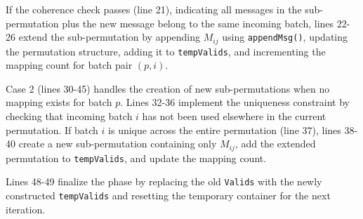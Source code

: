 \documentclass{article}
\begin{document}
If the coherence check passes (line 21), 
indicating all messages in the sub-permutation 
plus the new message belong to the same 
incoming batch, lines 22-26 extend the 
sub-permutation by appending $M_{ij}$ 
using \texttt{appendMsg()}, updating the 
permutation structure, adding it 
to \texttt{tempValids}, and incrementing 
the mapping count for batch pair $(p,i)$.

Case 2 (lines 30-45) handles the creation 
of new sub-permutations when no mapping 
exists for batch $p$. Lines 32-36 implement 
the uniqueness constraint by checking that 
incoming batch $i$ has not been used 
elsewhere in the current permutation. 
If batch $i$ is unique across the entire 
permutation (line 37), lines 38-40 create 
a new sub-permutation containing only $M_{ij}$, 
add the extended permutation to \texttt{tempValids}, 
and update the mapping count.

Lines 48-49 finalize the phase by replacing 
the old \texttt{Valids} with the newly 
constructed \texttt{tempValids} and resetting 
the temporary container for the next iteration.
\end{document}
